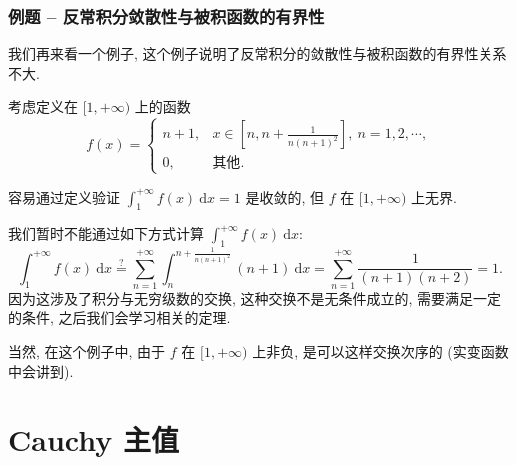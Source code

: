 \begin{frame}
\frametitle{例题 -- 反常积分敛散性与被积函数的有界性}

我们再来看一个例子, 这个例子说明了反常积分的敛散性与被积函数的有界性关系不大.

\pause
\vspace{0.5em}

考虑定义在 $[1, +\infty)$ 上的函数
\[
f(x) = \begin{cases}
n + 1, & x \in [n, n+\frac{1}{n(n+1)^2}], ~ n = 1, 2, \cdots, \\[6pt]
0, & \text{其他}.
\end{cases}
\]

\pause
容易通过定义验证 $\int_1^{+\infty} f(x) ~ \mathrm{d} x = 1$ 是收敛的, 但 $f$ 在 $[1, +\infty)$ 上无界.

\pause

\begin{attnblock}
我们暂时不能通过如下方式计算 $\int_1^{+\infty} f(x) ~ \mathrm{d} x$:
\[
\int_1^{+\infty} f(x) ~ \mathrm{d} x \stackrel{?}{=} \sum_{n = 1}^{+\infty} \int_n^{n + \frac{1}{n(n+1)^2}} (n + 1) ~ \mathrm{d} x = \sum_{n = 1}^{+\infty} \frac{1}{(n + 1)(n + 2)} = 1.
\]
因为这涉及了积分与无穷级数的交换, 这种交换不是无条件成立的, 需要满足一定的条件, 之后我们会学习相关的定理.

\pause
\vspace{0.5em}

当然, 在这个例子中, 由于 $f$ 在 $[1, +\infty)$ 上非负, 是可以这样交换次序的 (实变函数中会讲到).
\end{attnblock}

\end{frame}


\section{Cauchy 主值}


